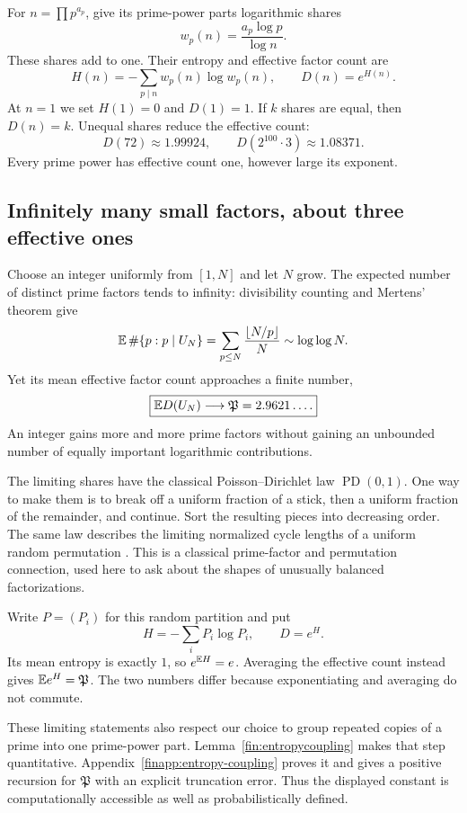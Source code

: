For $n=\prod p^{a_p}$, give its prime-power parts logarithmic shares
\[
 w_p(n)=\frac{a_p\log p}{\log n}.
\]
These shares add to one.  Their entropy and effective factor count are
\[
 H(n)=-\sum_{p\mid n}w_p(n)\log w_p(n),\qquad D(n)=e^{H(n)}.
\]
At $n=1$ we set $H(1)=0$ and $D(1)=1$.
If $k$ shares are equal, then $D(n)=k$.
Unequal shares reduce the effective count:
\[
 D(72)\approx1.99924,\qquad
 D(2^{100}\cdot3)\approx1.08371.
\]
Every prime power has effective count one, however large its exponent.

\subsection{Infinitely many small factors, about three effective ones}
Choose an integer uniformly from $[1,N]$ and let $N$ grow.
The expected number of distinct prime factors tends to infinity:
divisibility counting and Mertens' theorem give
\[
 \mathbb E\,\#\{p:p\mid U_N\}
 =\sum_{p\le N}\frac{\lfloor N/p\rfloor}{N}
 \sim\log\log N.
\]
Yet its mean effective factor count approaches a finite number,
\[
 \boxed{\mathbb E D(U_N)\longrightarrow
       \mathfrak P=2.9621\ldots.}
\]
An integer gains more and more prime factors without gaining an
unbounded number of equally important logarithmic contributions.

The limiting shares have the classical
Poisson--Dirichlet law $\operatorname{PD}(0,1)$.
One way to make them is to break off a uniform fraction of a stick,
then a uniform fraction of the remainder, and continue.
Sort the resulting pieces into decreasing order.
The same law describes the limiting normalized cycle lengths of a
uniform random permutation
\cite[remarks after Theorem 1, part (d)]{finHaddadKoukoulopoulos}.
This is a classical prime-factor and
permutation connection, used here to ask about the shapes of unusually
balanced factorizations.

Write $P=(P_i)$ for this random partition and put
\[
 H=-\sum_iP_i\log P_i,\qquad D=e^H.
\]
Its mean entropy is exactly $1$, so $e^{\mathbb E H}=e$.
Averaging the effective count instead gives $\mathbb E e^H=\mathfrak P$.
The two numbers differ because exponentiating and averaging do not
commute.

These limiting statements also respect our choice to group repeated
copies of a prime into one prime-power part.
Lemma~\ref{fin:entropycoupling} makes that step quantitative.
Appendix~\ref{finapp:entropy-coupling} proves it and gives a positive
recursion for $\mathfrak P$ with an explicit truncation error.
Thus the displayed constant is computationally accessible as well as
probabilistically defined.

